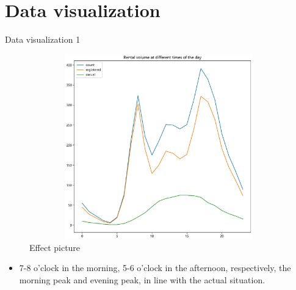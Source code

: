 \documentclass[
  size=14pt,
  paper=smartboard,  %
  mode=present, 		%
  display=slides, 	%
  style=tuliplab,  	%
  pauseslide,
  fleqn,leqno]{powerdot}
\begin{document}
        \section{Data visualization}   
        \begin{slide}{Data visualization 1}
          
          \begin{figure}[htb]
            \centering
            \includegraphics[width=12cm,height=8cm,trim=60 60 60 60,clip]{figures//time_day.eps}
            \vspace{-1.6em}
            \caption{Effect picture}
          \end{figure}
          \vspace{-1.6em}
          \begin{itemize}
            \item
            7-8 o'clock in the morning, 5-6 o'clock in the afternoon, respectively, the morning peak and evening peak, in line with the actual situation.
            \end{itemize}       
        \end{slide}
\end{document}
